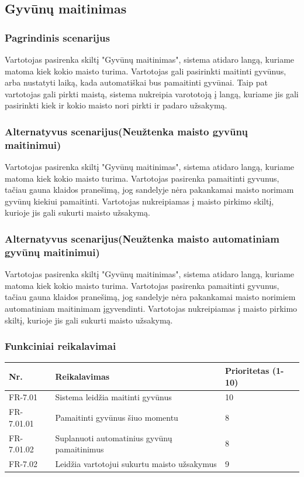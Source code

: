\documentclass[oneside]{VUMIFPSkursinis}
\begin{document}
\subsection{Gyvūnų maitinimas}
\subsubsection{Pagrindinis scenarijus}
	Vartotojas pasirenka skiltį "Gyvūnų maitinimas", sistema atidaro langą, kuriame matoma kiek kokio maisto turima. Vartotojas gali pasirinkti maitinti gyvūnus, arba nustatyti laiką, kada automatiškai bus pamaitinti gyvūnai. Taip pat vartotojas gali pirkti maistą, sistema nukreipia varototoją į langą, kuriame jis gali pasirinkti kiek ir kokio maisto nori pirkti ir padaro užsakymą.
\subsubsection{Alternatyvus scenarijus(Neužtenka maisto gyvūnų maitinimui)}
	Vartotojas pasirenka skiltį "Gyvūnų maitinimas", sistema atidaro langą, kuriame matoma kiek kokio maisto turima. Vartotojas pasirenka pamaitinti gyvunus, tačiau gauna klaidos pranešimą, jog sandelyje nėra pakankamai maisto norimam gyvūnų kiekiui pamaitinti. Vartotojas nukreipiamas į maisto pirkimo skiltį, kurioje jis gali sukurti maisto užsakymą.
\subsubsection{Alternatyvus scenarijus(Neužtenka maisto automatiniam gyvūnų maitinimui)}
	Vartotojas pasirenka skiltį "Gyvūnų maitinimas", sistema atidaro langą, kuriame matoma kiek kokio maisto turima. Vartotojas pasirenka pamaitinti gyvunus, tačiau gauna klaidos pranešimą, jog sandelyje nėra pakankamai maisto norimiem automatiniam maitinimam įgyvendinti. Vartotojas nukreipiamas į maisto pirkimo skiltį, kurioje jis gali sukurti maisto užsakymą.
\subsubsection{Funkciniai reikalavimai}
\begin{table}[htbp]
	\begin{tabularx}{1\textwidth}{ |P{2.5cm}|X|P{3cm }| }  \hline
    Nr. & Reikalavimas &  Prioritetas (1-10)  \\   \hline 
    FR-7.01 & Sistema leidžia maitinti gyvūnus & 10  \\   \hline
		FR-7.01.01 & Pamaitinti gyvūnus šiuo momentu & 8  \\ \hline
		FR-7.01.02 & Suplanuoti automatinius gyvūnų pamaitinimus & 8 \\ \hline
		FR-7.02 & Leidžia vartotojui sukurtu maisto užsakymus & 9 \\  \hline
	\end{tabularx}
\end{table}
\end{document}
